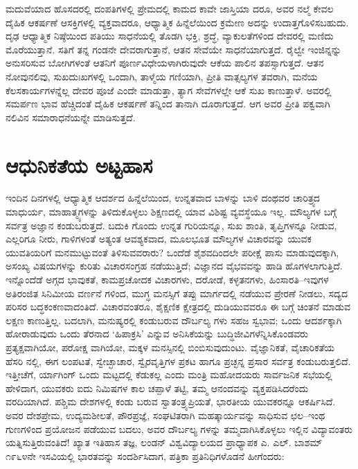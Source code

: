 ಮದುವೆಯಾದ ಹೊಸದರಲ್ಲಿ ದಂಪತಿಗಳಲ್ಲಿ ಪ್ರೇಮದಲ್ಲಿ ಕಾಮದ ಕಾವೇ ಜಾಸ್ತಿಯಾ ದರೂ, ಅವರ ನಲ್ಮೆ ಕೇವಲ ದೈಹಿಕ ಆಕರ್ಷಣೆ ಆಸಕ್ತಿಗಳಲ್ಲಿ ವ್ಯಕ್ತವಾದರೂ, ಆಧ್ಯಾತ್ಮಿಕ ಹಿನ್ನೆಲೆಯಿಂದ ಕ್ರಮೇಣ ಅದನ್ನು ಉದಾತ್ತಗೊಳಿಸಬಹುದು. ದೃಢ ಆಧ್ಯಾತ್ಮಿಕ ನಿಷ್ಠೆಯಿಂದ ಪತಿಯು ಸಾಧನೆಯಲ್ಲಿ ತೊಡಗಿ ಭಕ್ತಿ, ಶ್ರದ್ಧೆ, ವ್ಯಾಕುಲತೆಗಳಿಂದ ದೇವರಲ್ಲಿ ಮಣಿದು ಮೊರೆಯುತ್ತಾನೆ. ಸತಿಗೆ ತನ್ನ ಗಂಡನೇ ದೇವರಾಗುತ್ತಾನೆ, ಆತನ ಸೇವೆಯೇ ಸಾಧನೆಯಾಗುತ್ತದೆ. ರೈಲ್ವೇ ಇಂಜಿನ್ನನ್ನು ಅನುಸರಿಸುವ ಬೋಗಿಗಳಂತೆ ಆತನಿಗೆ ಪೂರ್ಣವಿಧೇಯಳಾಗಿರುವುದೇ ಆಕೆಯ ಪಾಲಿನ ತಪಸ್ಸಾಗುತ್ತದೆ. ಆತನ ನೋವುನಲಿವು, ಸುಖದುಃಖಗಳಲ್ಲಿ ಒಂದಾಗಿ, ತಾಳ್ಮೆಯ ಗಣಿಯಾಗಿ, ಪ್ರೀತಿ ವಾತ್ಸಲ್ಯಗಳ ತವರಾಗಿ, ಮನೆಯ ಕೆಲಸಕಾರ್ಯಗಳನ್ನೆಲ್ಲ ದೇವರ ಪೂಜೆ ಎಂದೇ ಮಾಡುತ್ತಾ, ತ್ಯಾಗ ಸೇವೆಗಳಲ್ಲೇ ಆಕೆ ಸುಖ ಕಾಣುತ್ತಾಳೆ. ಅವರಲ್ಲಿ ಸಮರ್ಪಣ ಭಾವ ಹೆಚ್ಚಿದಂತೆ ದೈಹಿಕ ಆಕರ್ಷಣೆ ತನ್ನಿಂದ ತಾನಾಗಿ ದೂರಾಗುತ್ತದೆ. ಆಗ ಅವರ ಪ್ರೀತಿ ಪಕ್ವವಾಗಿ ನಲಿವಿನ ಸಮಾರಾಧನೆಯನ್ನೇ ಮಾಡಿಸುತ್ತದೆ.


\section{ಆಧುನಿಕತೆಯ ಅಟ್ಟಹಾಸ}

ಇಂದಿನ ದಿನಗಳಲ್ಲಿ ಆಧ್ಯಾತ್ಮಿಕ ಆದರ್ಶದ ಹಿನ್ನೆಲೆಯಿಂದ, ಉನ್ನತವಾದ ಬಾಳನ್ನು ಬಾಳಿ ದಂಥವರ ಚಾರಿತ್ರ್ಯದ ಮಾಧುರ್ಯ, ಮಾಹಾತ್ಮ್ಯಗಳನ್ನು ತಿಳಿದುಕೊಳ್ಳಲು ಶಿಕ್ಷಣದಲ್ಲಿ ಯಾವ ವಿಶಿಷ್ಟ ವ್ಯವಸ್ಥೆಯೂ ಇಲ್ಲ. ಮೌಲ್ಯಗಳ ಬಗ್ಗೆ ಸರ್ವತ್ರ ಅಜ್ಞಾನ ಕಂಡುಬರುತ್ತದೆ. ಬದುಕಿ ಗೊಂದು ಉನ್ನತ ಗುರಿಯನ್ನೂ, ಸುಖ ಶಾಂತಿ, ತೃಪ್ತಿಗಳನ್ನೂ ನೀಡುವ, ಎಲ್ಲರಿಗೂ ನೀರು, ಗಾಳಿಗಳಂತೆ ಅತ್ಯಂತ ಆವಶ್ಯಕವಾದ, ಮೂಲಭೂತ ಮೌಲ್ಯಗಳ ವಿಚಾರವನ್ನು ಯುವಕ ಯುವತಿಯರಿಗೆ ಮನಮುಟ್ಟುವಂತೆ ತಿಳಿಸುವವರಾರು? ಒಂದೆಡೆ ಶೈಶವದಿಂದಲೇ ಪರೀಕ್ಷೆ ಪಾಸು ಮಾಡುವುದಕ್ಕಾಗಿ, ಅಸಂಖ್ಯ ವಿಷಯಗಳನ್ನು ಕುರಿತು ವಿಚಾರಸಂಗ್ರಹ ನಡೆಯುತ್ತಿದೆ; ವಿಜ್ಞಾನದ ವೈಭವವನ್ನು ಹಾಡಿ ಹೊಗಳಲಾಗುತ್ತಿದೆ. ಇನ್ನೊಂದೆಡೆ ಅಗ್ಗದ ಭಾವುಕತೆ, ಕಾಮಪ್ರಚೋದಕ ವಿಚಾರಗಳು, ದರೋಡೆ, ಕಳ್ಳತನಗಳು, ಹಿಂಸಾರತಿ–ಇವುಗಳ ಅತಿರಂಜಿತ ಸಿನಿಮೀಯ ವರ್ಣನೆ ಗಳಿಂದ, ಮುಗ್ಧ ಮನಸ್ಸಿಗೆ ತಪ್ಪು ಮಾರ್ಗದಲ್ಲಿ ನಡೆಯುವ ಪ್ರೇರಣೆ ನೀಡಲು, ಸದ್ಯದ ಪರಿಸರ ಬದ್ಧಕಂಕಣವಾದಂತಿದೆ. ವಿಚಾರವಂತರೂ, ಶೈಕ್ಷಣಿಕ ಕ್ಷೇತ್ರದಲ್ಲಿ ದುಡಿಯುವವರೂ ಈ ಬಗ್ಗೆ ಚಿಂತನೆ ಮಾಡುವ ಲಕ್ಷಣ ಕಾಣುತ್ತಿಲ್ಲ. ಬದಲಾಗಿ, ಮನುಷ್ಯರಲ್ಲಿ ಕಂಡುಬರುವ ದೌರ್ಬಲ್ಯ ಗಳು ಸಹಜ ಸ್ವಭಾವ; ಒಂದು ಆದರ್ಶಕ್ಕಾಗಿ ಹೋರಾಡುವುದು ಒಂದು ತೆರನಾದ ‘ಹಿಪಾಕ್ರಸಿ’ ಎನ್ನುವ ಅನಿಸಿಕೆಯನ್ನು ಬುದ್ಧಿಜೀವಿಗಳೆನ್ನಿಸಿಕೊಂಡವರು ಪ್ರತ್ಯಕ್ಷವಾಗಿಯೋ, ಪರೋಕ್ಷ ವಾಗಿಯೋ, ಮಕ್ಕಳ ಮನಸ್ಸಿನಲ್ಲಿ ಬಿಂಬಿಸುವುದುಂಟು. ವೈಜ್ಞಾನಿಕತೆ, ವೈಚಾರಿಕತೆಯ ಹೆಸರಿ ನಲ್ಲಿ, ಈಗ ಲಂಪಟತೆ, ಸ್ವೇಚ್ಛಾಚಾರ, ಸ್ವೈರವೃತ್ತಿಗಳ ಪ್ರಕಟ ಹಾಗೂ ಪ್ರಚ್ಛನ್ನ ಪ್ರಸಾರ ಸರ್ವತ್ರ ಕಂಡುಬರುತ್ತಲಿದೆ. ಇತ್ತೀಚೆಗೆ, ರ್ಯಾಗಿಂಗ್ ಒಂದು ಮಟ್ಟದಲ್ಲಿ ಕೆಡುಕಲ್ಲ ಎಂದು ಮಂತ್ರಿ ಮಹೋದಯರು ಸಾರ್ವಜನಿಕ ಸಭೆಯಲ್ಲಿ ಹೇಳಿದಾಗ, ಯುವಕರು ಐದು ನಿಮಿಷಗಳ ಕಾಲ ಚಪ್ಪಾಳೆ ತಟ್ಟಿ, ತಮ್ಮ ಆನಂದವನ್ನು ವ್ಯಕ್ತಪಡಿಸಿದರೆಂದು ವರದಿಯಾಗಿದೆ. ಪಶ್ಚಿಮ ದೇಶಗಳಲ್ಲಿ ಕಂಡು ಬರುವ ಸ್ವಾತಂತ್ರ್ಯಪ್ರಿಯತೆ, ಭಾರತೀಯ ಯುವಕರನ್ನೂ ಆಕರ್ಷಿಸಿದೆ. ಅವರ ದೇಶಪ್ರೇಮ, ಉದ್ಯಮಶೀಲತೆ, ಪೌರಪ್ರಜ್ಞೆ, ಸಂಘಟಿತರಾಗಿ ಮಹತ್ಕಾರ್ಯವನ್ನು ಸಾಧಿಸುವ ಛಲ–ಇಂಥ ಗುಣಗಳಿಂದ ಪ್ರಯೋಜನ ಪಡೆಯುವ ಬದಲು, ಅವರ ದೌರ್ಬಲ್ಯ ಗಳನ್ನು ತಮ್ಮದಾಗಿಸಿಕೊಳ್ಳಲು ಇಲ್ಲಿನ ವಿದ್ಯಾವಂತರು ಯತ್ನಿಸುತ್ತಿರುವಂತಿದೆ! ಖ್ಯಾತ ಇತಿಹಾಸ ತಜ್ಞ, ಲಂಡನ್ ವಿಶ್ವವಿದ್ಯಾಲಯದ ಪ್ರಾಧ್ಯಾಪಕ ಎ. ಎಲ್. ಬಾಶಮ್ ೧೯೬೪ನೇ ಇಸವಿಯಲ್ಲಿ ಭಾರತವನ್ನು ಸಂದರ್ಶಿಸಿದಾಗ, ಪತ್ರಿಕಾ ಪ್ರತಿನಿಧಿಗಳೊಡನೆ ಹೀಗೆಂದರು:

